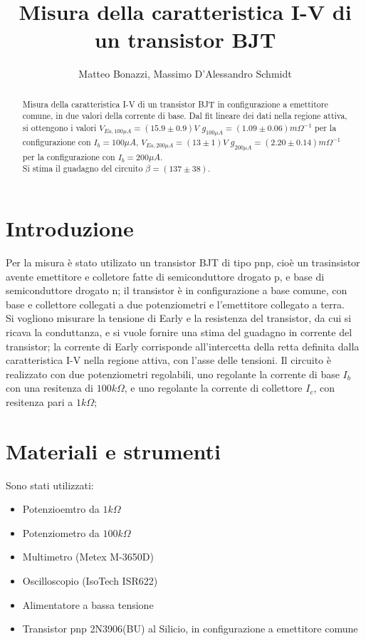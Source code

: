 \documentclass{article}
\title{Misura della caratteristica I-V di un transistor BJT}
\author{Matteo Bonazzi, Massimo D'Alessandro Schmidt}
\begin{document}
\maketitle
\begin{abstract}
    Misura della caratteristica I-V di un transistor BJT in configurazione a emettitore comune, in due valori della corrente di base.\newline
    Dal fit lineare dei dati nella regione attiva, si ottengono i valori $V_{Ea,100\mu A}=(15.9\pm 0.9) V$ $g_{100 \mu A}=(1.09 \pm 0.06) m\Omega^{-1} $ per la configurazione con $I_b=100 \mu A$, $V_{Ea,200\mu A}=(13\pm 1) V $ $g_{200 \mu A}=(2.20 \pm 0.14) m\Omega^{-1}$ per la configurazione con $I_b=200 \mu A$.\\
    Si stima il guadagno del circuito $\beta=(137\pm38)$.\\
\end{abstract}

\section{Introduzione}
Per la misura è stato utilizato un transistor BJT di tipo pnp, cioè un trasinsistor avente emettitore e colletore fatte di semiconduttore drogato p, e base di semiconduttore drogato n; il transistor è in configurazione a base comune, con base
e collettore collegati a due potenziometri e l'emettitore collegato a terra.\\
Si vogliono misurare la tensione di Early e la resistenza del transistor, da cui si ricava la conduttanza, e si vuole fornire una stima del guadagno in corrente del transistor;
la corrente di Early corrisponde all'intercetta della retta definita dalla caratteristica I-V nella regione attiva, con l'asse delle tensioni.
Il circuito è realizzato con due potenziometri regolabili, uno regolante la corrente di base $I_b$ con una resitenza di $100k\Omega$, e uno regolante
la corrente di collettore $I_c$, con resitenza pari a $1k\Omega$;

\section{Materiali e strumenti}
Sono stati utilizzati:
\begin{itemize}
    \item Potenzioemtro da $1 k\Omega$
    \item Potenziometro da $100 k\Omega$
    \item Multimetro (Metex M-3650D)
    \item Oscilloscopio (IsoTech ISR622)
    \item Alimentatore a bassa tensione
    \item Transistor pnp 2N3906(BU) al Silicio, in configurazione a emettitore comune
\end{itemize}
\end{document}
